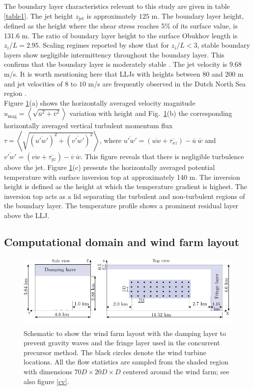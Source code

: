 \documentclass[%
 aip,
 amsmath,amssymb,
reprint,
twocolumn,%
author-numerical,%
]{revtex4-1}
\begin{document}
\indent The boundary layer characteristics relevant to this study are given in table \ref{table1}. {\color{black} The jet height $z_\text{jet}$ is approximately $125$ m. The boundary layer height, defined as the height where the shear stress reaches 5\% of its surface value\cite{bea06}, is 131.6 m. The ratio of boundary layer height to the surface Obukhov length is $z_i/L=2.95$. Scaling regimes reported by \citeauthor{hol86} \cite{hol86} show that for $z_i/L < 3$, stable boundary layers show negligible intermittency throughout the boundary layer. This confirms that the boundary layer is moderately stable \cite{hol86}. The jet velocity is 9.68 m/s. It is worth mentioning here that LLJs with heights between 80 and 200 m and jet velocities of $8$ to $10$ m/s are frequently observed in the Dutch North Sea region \cite{baa09}.}\\
\indent Figure \ref{fig3}(a) shows the horizontally averaged velocity magnitude $u_\text{mag}=\left<\sqrt{\overline{u}^2+\overline{v}^2}\right>$ variation with height and Fig.\ \ref{fig3}(b) the corresponding horizontally averaged vertical turbulent momentum flux $\tau=\left<\sqrt{(\overline{u'w'})^2 + (\overline{v'w'})^2}\right>$, where $\overline{u'w'}=\left(\overline{{uw}} + \overline{\tau_{xz}}\right)-\overline{{u}}~\overline{{w}}$ and $\overline{v'w'}=\left(\overline{{vw}} + \overline{\tau_{yz}}\right)-\overline{{v}}~\overline{{w}}$. {\color{black} This figure reveals that there is negligible turbulence above the jet. Figure \ref{fig3}(c) presents the horizontally averaged potential temperature with surface inversion top at approximately 140 m. The inversion height is defined as the height at which the temperature gradient is highest. The inversion top acts as a lid separating the turbulent and non-turbulent regions of the boundary layer. The temperature profile shows a prominent residual layer above the LLJ.}
\subsection{Computational domain and wind farm layout}\label{sec2.4} 
\begin{figure}[ht!]
	\centering
	\includegraphics[width=\linewidth]{fig3}
	\caption{Schematic to show the wind farm layout with the damping layer to prevent gravity waves and the fringe layer used in the concurrent precursor method. The black circles denote the wind turbine locations. All the flow statistics are sampled from the shaded region with dimensions $70D\times{20D}\times{D}$ centered around the wind farm; see also figure \ref{cv}.}
	\label{fig3}
\end{figure}
\end{document}
